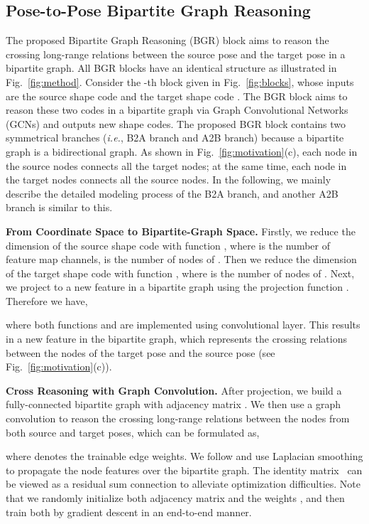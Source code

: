\documentclass{bmvc2k}
\begin{document}
\subsection{Pose-to-Pose Bipartite Graph Reasoning}
The proposed Bipartite Graph Reasoning (BGR) block aims to reason the crossing long-range relations between the source pose and the target pose in a bipartite graph.
All BGR blocks have an identical structure as illustrated in Fig.~\ref{fig:method}. 
Consider the -th block given in Fig.~\ref{fig:blocks}, whose inputs are the source shape code  and the target shape code .
The BGR block aims to reason these two codes in a bipartite graph via Graph Convolutional Networks (GCNs) and outputs new shape codes.
The proposed BGR block contains two symmetrical branches (\emph{i.e.}, B2A branch and A2B branch) because a bipartite graph is a bidirectional graph. As shown in Fig.~\ref{fig:motivation}(c), each node in the source nodes connects all the target nodes; at the same time, each node in the target nodes connects all the source nodes.
In the following, we mainly describe the detailed modeling process of the B2A branch, and another A2B branch is similar to this.

\noindent \textbf{From Coordinate Space to Bipartite-Graph Space.}
Firstly, we reduce the dimension of the source shape code  with function , where  is the number of feature map channels,  is the number of nodes of .
Then we reduce the dimension of the target shape code  with function , where  is the number of nodes of .
Next, we project  to a new feature  in a bipartite graph using the projection function . 
Therefore we have,

where both functions  and  are implemented using  convolutional layer. 
This results in a new feature  in the bipartite graph, which represents the crossing relations between the nodes of the target pose  and the source pose  (see Fig.~\ref{fig:motivation}(c)).

\noindent \textbf{Cross Reasoning with Graph Convolution.}
After projection, we build a fully-connected bipartite graph with adjacency matrix . 
We then use a graph convolution to reason the crossing long-range relations between the nodes from both source and target poses, which can be formulated as,

where  denotes the trainable edge weights.
We follow \cite{chen2019graph,zhang2019dual} and use Laplacian smoothing  \cite{chen2019graph,li2018deeper} to propagate the node features over the bipartite graph. 
The identity matrix~ can be viewed as a residual sum connection to alleviate optimization difficulties. 
Note that we randomly initialize both adjacency matrix  and the weights , and then train both by gradient descent in an end-to-end manner.
\end{document}
